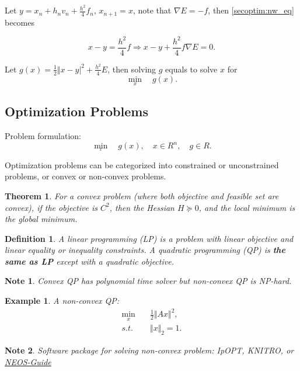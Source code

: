 \documentclass{fancydoc}
\newtheorem{mydef}{Definition}
\newtheorem{thm}{Theorem}
\newtheorem{note}{Note}
\newtheorem{ex}{Example}
\begin{document}
Let $y = x_n + h_nv_n + \frac{h^2}{4}f_n$, $x_{n+1} = x$, note that $\nabla E = -f$, then \eqref{secoptim:nw_eq} becomes

\begin{equation}
x - y = \frac{h^2}{4}f \Rightarrow x - y + \frac{h^2}{4}f\nabla E = 0.
\end{equation}

Let $g(x) = \frac{1}{2}\Vert x-y\vert^2 + \frac{h^2}{4}E$, then solving $g$ equals to solve $x$ for
\begin{equation}
\min_{x} \quad g(x).
\end{equation}

\subsection{Optimization Problems}
Problem formulation:
\begin{equation}\label{problem_optim_nonlinear}
\min_{_x} \quad g(x), \quad x\in \!R^n, \quad g\in \!R.
\end{equation}

Optimization problems can be categorized into constrained or unconstrained problems, or convex or non-convex problems. 

\begin{thm}
	For a convex problem (where both objective and feasible set are convex), if the objective is $\!C^2$, then the Hessian $H \succeq 0$, and the local minimum is the global minimum.
\end{thm}

\begin{mydef}
	A linear programming (LP) is a problem with linear objective and linear equality or inequality constraints. A quadratic programming (QP) is {\bf the same as LP} except with a quadratic objective.
\end{mydef}

\begin{note}
	Convex QP has polynomial time solver but non-convex QP is NP-hard.
\end{note}
\begin{ex}
	A non-convex QP: 
	\begin{subequations}
		\begin{align}
		\min_{x} \quad&\frac{1}{2} \Vert Ax \Vert^2, \\
		s.t. \quad & \Vert x \Vert_2 = 1.
		\end{align}
	\end{subequations}
\end{ex}
\begin{note}
	Software package for solving non-convex problem: {\rm IpOPT}, {\rm KNITRO}, or \href{https://neos-guide.org/}{NEOS-Guide} 
\end{note}
\end{document}
